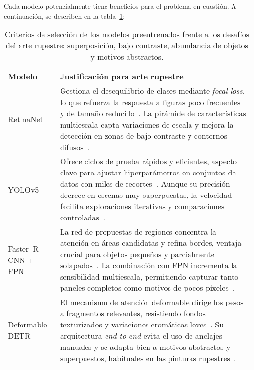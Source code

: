 Cada modelo potencialmente tiene beneficios para el problema en cuestión.
A continuación, se describen en la tabla~\ref{tab:justificacion_modelos}:

\begin{table}[!h]
    \centering
    \begin{tabular}{p{3.5cm} p{10.8cm}}
        \hline
        \textbf{Modelo} & \textbf{Justificación para arte rupestre} \\
        \hline
        RetinaNet &
        Gestiona el desequilibrio de clases mediante \emph{focal loss}, lo que refuerza la respuesta a figuras poco frecuentes y de tamaño reducido~\cite{lin2017focal,suhaimi2023}.
        La pirámide de características multiescala capta variaciones de escala y mejora la detección en zonas de bajo contraste y contornos difusos~\cite{esri_retinanet,wunderlich2023}. \\[0.4em]

        YOLOv5 &
        Ofrece ciclos de prueba rápidos y eficientes, aspecto clave para ajustar hiperparámetros en conjuntos de datos con miles de recortes~\cite{yolov5,suhaimi2023}.
        Aunque su precisión decrece en escenas muy superpuestas, la velocidad facilita exploraciones iterativas y comparaciones controladas~\cite{li2022}. \\[0.4em]

        Faster~R-CNN + FPN &
        La red de propuestas de regiones concentra la atención en áreas candidatas y refina bordes, ventaja crucial para objetos pequeños y parcialmente solapados~\cite{ren2015faster}.
        La combinación con FPN incrementa la sensibilidad multiescala, permitiendo capturar tanto paneles completos como motivos de pocos píxeles~\cite{suhaimi2023}. \\[0.4em]

        Deformable DETR &
        El mecanismo de atención deformable dirige los pesos a fragmentos relevantes, resistiendo fondos texturizados y variaciones cromáticas leves~\cite{zhu2021,smallobjDETR}.
        Su arquitectura \emph{end-to-end} evita el uso de anclajes manuales y se adapta bien a motivos abstractos y superpuestos, habituales en las pinturas rupestres~\cite{horn2022ai}. \\
    \end{tabular}
    \caption{Criterios de selección de los modelos preentrenados frente a los desafíos del arte rupestre: superposición, bajo contraste, abundancia de objetos y motivos abstractos.}
    \label{tab:justificacion_modelos}
\end{table}


